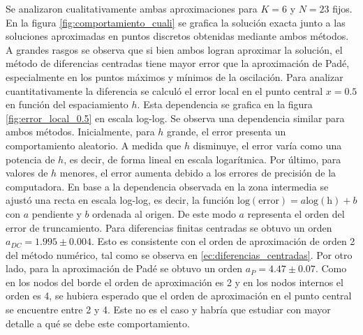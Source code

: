 \documentclass[aps,prb,twocolumn,superscriptaddress,floatfix,longbibliography]{revtex4-2}
\newif\ifptitle
\newif\ifpnumber
\newcounter{para}
\newcommand\ptitle[1]{\par\refstepcounter{para}
{\ifpnumber{\noindent\textcolor{lightgray}{\textbf{\thepara}}\indent}\fi}
{\ifptitle{\textbf{[{#1}]}}\fi}}
\begin{document}
\ptitle{Comportamiento cualitativo}
Se analizaron cualitativamente ambas aproximaciones para $K=6$ y $N=23$ fijos. En la figura \ref{fig:comportamiento_cuali} se grafica la solución exacta junto a las soluciones aproximadas en puntos discretos obtenidas mediante ambos métodos. A grandes rasgos se observa que si bien ambos logran aproximar la solución, el método de diferencias centradas tiene mayor error que la aproximación de Padé, especialmente en los puntos máximos y mínimos de la oscilación. Para analizar cuantitativamente la diferencia se calculó el error local en el punto central $x = 0.5$ en función del espaciamiento $h$. Esta dependencia se grafica en la figura \ref{fig:error_local_0.5} en escala log-log. Se observa una dependencia similar para ambos métodos. Inicialmente, para $h$ grande, el error presenta un comportamiento aleatorio. A medida que $h$ disminuye, el error varía como una potencia de $h$, es decir, de forma lineal en escala logarítmica. Por último, para valores de $h$ menores, el error aumenta debido a los errores de precisión de la computadora. En base a la dependencia observada en la zona intermedia se ajustó una recta en escala log-log, es decir, la función $\mathrm{log(error)} = a \mathrm{log(h)} + b$ con $a$ pendiente y $b$ ordenada al origen. De este modo $a$ representa el orden del error de truncamiento. Para diferencias finitas centradas se obtuvo un orden $a_{DC} = 1.995 \pm 0.004$. Esto es consistente con el orden de aproximación de orden 2 del método numérico, tal como se observa en \ref{ec:diferencias_centradas}. Por otro lado, para la aproximación de Padé se obtuvo un orden $a_P = 4.47 \pm 0.07$. Como en los nodos del borde el orden de aproximación es 2 y en los nodos internos el orden es 4, se hubiera esperado que el orden de aproximación en el punto central se encuentre entre 2 y 4. Este no es el caso y habría que estudiar con mayor detalle a qué se debe este comportamiento.
\end{document}
